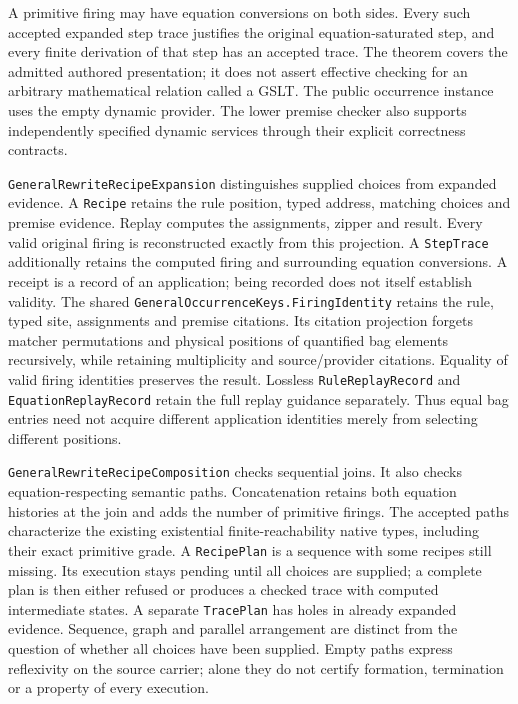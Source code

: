 \documentclass[11pt]{article}
\newcommand{\code}[1]{\nolinkurl{#1}}
\begin{document}
A primitive firing may have equation conversions on both sides. Every such
accepted expanded step trace justifies the original equation-saturated step,
and every finite derivation of that step has an accepted trace. The theorem covers
the admitted authored presentation; it does not assert effective checking
for an arbitrary mathematical relation called a GSLT. The public occurrence
instance uses the empty dynamic provider. The lower premise checker also
supports independently specified dynamic services through their explicit
correctness contracts.

\code{GeneralRewriteRecipeExpansion} distinguishes supplied choices from
expanded evidence. A \code{Recipe} retains the rule position, typed address,
matching choices and premise evidence. Replay computes the assignments,
zipper and result. Every valid original firing is reconstructed exactly
from this projection. A \code{StepTrace} additionally retains the computed
firing and surrounding equation conversions. A receipt is a record of an
application; being recorded does not itself establish validity.
The shared \code{GeneralOccurrenceKeys.FiringIdentity} retains the rule,
typed site, assignments and premise citations. Its citation projection
forgets matcher permutations and physical positions of quantified bag
elements recursively, while retaining multiplicity and source/provider
citations. Equality of valid firing identities preserves the result.
Lossless \code{RuleReplayRecord} and \code{EquationReplayRecord} retain the
full replay guidance separately. Thus equal bag entries need not acquire
different application identities merely from selecting different positions.

\code{GeneralRewriteRecipeComposition} checks sequential joins.
It also checks equation-respecting semantic paths. Concatenation retains both equation
histories at the join and adds the number of primitive firings. The accepted
paths characterize the existing existential finite-reachability native types,
including their exact primitive grade. A \code{RecipePlan} is a sequence with
some recipes still missing. Its execution stays pending until all choices
are supplied; a complete plan is then either refused or produces a checked
trace with computed intermediate states. A separate \code{TracePlan} has
holes in already expanded evidence. Sequence, graph and parallel
arrangement are distinct from the question of whether all choices have been
supplied. Empty paths express reflexivity on the source carrier; alone they
do not certify formation, termination or a property of every execution.
\end{document}
